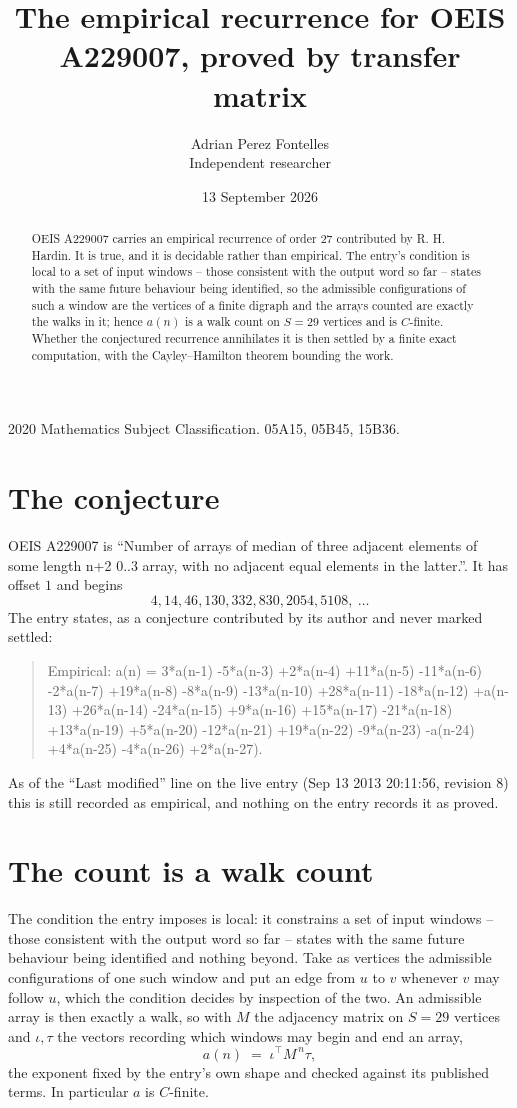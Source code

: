 \documentclass[11pt,a4paper]{article}
\title{The empirical recurrence for OEIS A229007, proved by transfer matrix}
\author{Adrian Perez Fontelles\\ \small Independent researcher}
\date{13 September 2026}
\theoremstyle{plain}
\theoremstyle{definition}
\begin{document}
\maketitle

\begin{abstract}
OEIS A229007 carries an empirical recurrence of order $27$ contributed by R. H. Hardin. It is
true, and it is decidable rather than empirical. The entry's condition is local to a set of input windows -- those consistent with the output word so far -- states with the same future behaviour being identified, so
the admissible configurations of such a window are the vertices of a finite digraph and the
arrays counted are exactly the walks in it; hence $a(n)$ is a walk count on $S=29$ vertices
and is $C$-finite. Whether the conjectured recurrence annihilates it is then settled by a
finite exact computation, with the Cayley--Hamilton theorem bounding the work.
\end{abstract}

\noindent\small 2020 Mathematics Subject Classification. 05A15, 05B45, 15B36.\normalsize

\section{The conjecture}

OEIS A229007 is ``Number of arrays of median of three adjacent elements of some length n+2 0..3 array, with no adjacent equal elements in the latter.''. It has offset $1$ and begins
\[
4, 14, 46, 130, 332, 830, 2054, 5108,\ \dots
\]
The entry states, as a conjecture contributed by its author and never marked settled:
\begin{quote}
Empirical: a(n) = 3*a(n-1) -5*a(n-3) +2*a(n-4) +11*a(n-5) -11*a(n-6) -2*a(n-7) +19*a(n-8) -8*a(n-9) -13*a(n-10) +28*a(n-11) -18*a(n-12) +a(n-13) +26*a(n-14) -24*a(n-15) +9*a(n-16) +15*a(n-17) -21*a(n-18) +13*a(n-19) +5*a(n-20) -12*a(n-21) +19*a(n-22) -9*a(n-23) -a(n-24) +4*a(n-25) -4*a(n-26) +2*a(n-27).
\end{quote}
As of the ``Last modified'' line on the live entry (Sep 13 2013 20:11:56, revision 8) this is still
recorded as empirical, and nothing on the entry records it as proved.

\section{The count is a walk count}

The condition the entry imposes is local: it constrains a set of input windows -- those consistent with the output word so far -- states with the same future behaviour being identified and nothing beyond. Take as
vertices the admissible configurations of one such window and put an edge from $u$ to $v$
whenever $v$ may follow $u$, which the condition decides by inspection of the two. An
admissible array is then exactly a walk, so with $M$ the adjacency matrix on $S=29$ vertices
and $\iota,\tau$ the vectors recording which windows may begin and end an array,
\[
a(n)\;=\;\iota^{\!\top}M^{\,n}\tau ,
\]
the exponent fixed by the entry's own shape and checked against its published terms. In
particular $a$ is $C$-finite.
\end{document}
